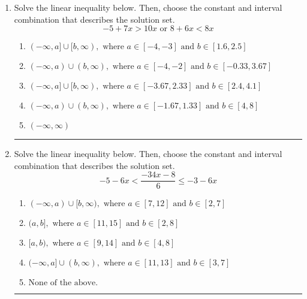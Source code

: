 \documentclass[14pt]{extbook}
\newcommand{\litem}[1]{\item#1\hspace*{-1cm}\rule{\textwidth}{0.4pt}}
\begin{document}
\begin{enumerate}
{\begin{enumerate}[label=\Alph*.]
\end{enumerate} }
\litem{
Solve the linear inequality below. Then, choose the constant and interval combination that describes the solution set.\[ -5 + 7 x > 10 x \text{ or } 8 + 6 x < 8 x \]\begin{enumerate}[label=\Alph*.]
\item \( (-\infty, a] \cup [b, \infty), \text{ where } a \in [-4, -3] \text{ and } b \in [1.6, 2.5] \)
\item \( (-\infty, a) \cup (b, \infty), \text{ where } a \in [-4, -2] \text{ and } b \in [-0.33, 3.67] \)
\item \( (-\infty, a] \cup [b, \infty), \text{ where } a \in [-3.67, 2.33] \text{ and } b \in [2.4, 4.1] \)
\item \( (-\infty, a) \cup (b, \infty), \text{ where } a \in [-1.67, 1.33] \text{ and } b \in [4, 8] \)
\item \( (-\infty, \infty) \)

\end{enumerate} }
\litem{
Solve the linear inequality below. Then, choose the constant and interval combination that describes the solution set.\[ -5 - 6 x < \frac{-34 x - 8}{6} \leq -3 - 6 x \]\begin{enumerate}[label=\Alph*.]
\item \( (-\infty, a) \cup [b, \infty), \text{ where } a \in [7, 12] \text{ and } b \in [2, 7] \)
\item \( (a, b], \text{ where } a \in [11, 15] \text{ and } b \in [2, 8] \)
\item \( [a, b), \text{ where } a \in [9, 14] \text{ and } b \in [4, 8] \)
\item \( (-\infty, a] \cup (b, \infty), \text{ where } a \in [11, 13] \text{ and } b \in [3, 7] \)
\item \( \text{None of the above.} \)

\end{enumerate} }
\end{enumerate}
\end{document}
